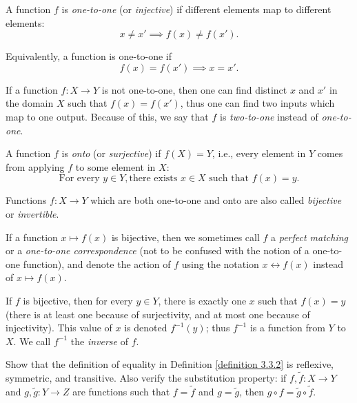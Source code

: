 \begin{definition}\label{definition 3.3.4}
A function \(f\) is \emph{one-to-one} (or \emph{injective}) if different elements map to different elements:
\[
    x \neq x' \implies f(x) \neq f(x').
\]

Equivalently, a function is one-to-one if
\[
    f(x) = f(x') \implies x = x'.
\]
\end{definition}

\begin{remark}
If a function \(f : X \to Y\) is not one-to-one, then one can find distinct \(x\) and \(x'\) in the domain \(X\) such that \(f(x) = f(x')\), thus one can find two inputs which map to one output.
Because of this, we say that \(f\) is \emph{two-to-one} instead of \emph{one-to-one}.
\end{remark}

\begin{definition}\label{definition 3.3.5}
A function \(f\) is \emph{onto} (or \emph{surjective}) if \(f(X) = Y\), i.e., every element in \(Y\) comes from applying \(f\) to some element in \(X\):
\[
    \text{For every } y \in Y, \text{there exists } x \in X \text{ such that } f(x) = y.
\]
\end{definition}

\begin{definition}\label{definition 3.3.6}
Functions \(f : X \to Y\) which are both one-to-one and onto are also called \emph{bijective} or \emph{invertible}.
\end{definition}

\begin{remark}
If a function \(x \mapsto f(x)\) is bijective, then we sometimes call \(f\) a \emph{perfect matching} or a \emph{one-to-one correspondence} (not to be confused with the notion of a one-to-one function), and denote the action of \(f\) using the notation \(x \leftrightarrow f(x)\) instead of \(x \mapsto f(x)\).
\end{remark}

If \(f\) is bijective, then for every \(y \in Y\), there is exactly one \(x\) such that \(f(x) = y\) (there is at least one because of surjectivity, and at most one because of injectivity).
This value of \(x\) is denoted \(f^{-1}(y)\); thus \(f^{-1}\) is a function from \(Y\) to \(X\).
We call \(f^{-1}\) the \emph{inverse} of \(f\).

\begin{exercise}\label{exercise 3.3.1}
Show that the definition of equality in Definition \ref{definition 3.3.2} is reflexive, symmetric, and transitive.
Also verify the substitution property: if \(f, \tilde{f} : X \to Y\) and \(g, \tilde{g} : Y \to Z\) are functions such that \(f = \tilde{f}\) and \(g = \tilde{g}\), then \(g \circ f = \tilde{g} \circ \tilde{f}\).
\end{exercise}

